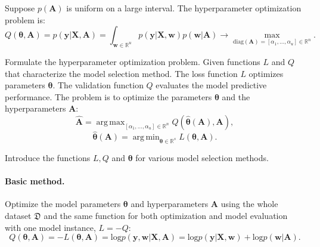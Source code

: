 \documentclass[smallcondensed]{svjour3}
\DeclareMathOperator*{\argmin}{arg\,min}
\DeclareMathOperator*{\argmax}{arg\,max}
\begin{document}
Suppose $p(\mathbf{A})$ is uniform on a large interval. The hyperparameter optimization problem is:
\begin{equation}
\label{eq:bayes2}
	Q(\boldsymbol{\theta}, \mathbf{A}) = p(\mathbf{y}|\mathbf{X},\mathbf{A}) = \int_{\mathbf{w} \in \mathbb{R}^u} p(\mathbf{y}|\mathbf{X}, \mathbf{w}) p(\mathbf{w}|\mathbf{A}) \to \max_{\text{diag}(\mathbf{A}) = [\alpha_1, \dots, \alpha_u] \in \mathbb{R}^{n}}.
\end{equation}


 
   


Formulate the hyperparameter optimization problem. Given functions $L$ and $Q$ that characterize the model selection method. The loss function $L$ optimizes parameters $\boldsymbol{\theta}$. The validation function $Q$ evaluates the model predictive performance.
The problem is to optimize the parameters $\boldsymbol{\theta}$ and the hyperparameters $\mathbf{A}$: 
\begin{equation}
\label{eq:main}
	\hat{\mathbf{A}} = \argmax_{[\alpha_1, \dots, \alpha_u] \in \mathbb{R}^n} Q(\hat{\boldsymbol{\theta}}(\mathbf{A}), \mathbf{A}),
\end{equation}
\begin{equation}
\label{eq:main2}
	\hat{\boldsymbol{\theta}}(\mathbf{A}) =  \argmin_{\boldsymbol{\theta} \in \mathbb{R}^s} L(\boldsymbol{\theta}, \mathbf{A}).
\end{equation}

Introduce the functions $L, Q$ and $\boldsymbol{\theta}$ for various model selection methods.

\paragraph{Basic method.}
Optimize the model parameters $\boldsymbol{\theta}$ and hyperparameters $\mathbf{A}$ using the whole dataset $\mathfrak{D}$ and the same function for both optimization and model evaluation with one model instance, $L = -Q$:
\begin{equation} 
\label{eq:basic}
Q(\boldsymbol{\theta}, \mathbf{A}) = -L(\boldsymbol{\theta}, \mathbf{A})  = \text{log}p(\mathbf{y}, \mathbf{w} | \mathbf{X}, \mathbf{A}) = \text{log} p(\mathbf{y}|\mathbf{X}, \mathbf{w})+\text{log}p(\mathbf{w}|\mathbf{A}).
\end{equation}
\end{document}
